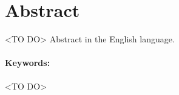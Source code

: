 \documentclass[12pt, twoside]{book}
\begin{document}
\section*{Abstract}

<TO DO> Abstract in the English language.


\paragraph*{Keywords:} <TO DO>


%
%
%


\newpage 

\tableofcontents


\newpage 

\listoffigures
\listoftables


\mainmatter
\pagestyle{headings}


 












\newpage	

\backmatter

\thispagestyle{empty}
\clearpage


 




\end{document}

